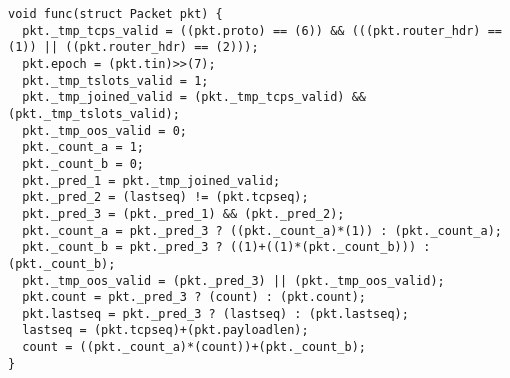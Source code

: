
\begin{lstlisting}
void func(struct Packet pkt) {
  pkt._tmp_tcps_valid = ((pkt.proto) == (6)) && (((pkt.router_hdr) == (1)) || ((pkt.router_hdr) == (2)));
  pkt.epoch = (pkt.tin)>>(7);
  pkt._tmp_tslots_valid = 1;
  pkt._tmp_joined_valid = (pkt._tmp_tcps_valid) && (pkt._tmp_tslots_valid);
  pkt._tmp_oos_valid = 0;
  pkt._count_a = 1;
  pkt._count_b = 0;
  pkt._pred_1 = pkt._tmp_joined_valid;
  pkt._pred_2 = (lastseq) != (pkt.tcpseq);
  pkt._pred_3 = (pkt._pred_1) && (pkt._pred_2);
  pkt._count_a = pkt._pred_3 ? ((pkt._count_a)*(1)) : (pkt._count_a);
  pkt._count_b = pkt._pred_3 ? ((1)+((1)*(pkt._count_b))) : (pkt._count_b);
  pkt._tmp_oos_valid = (pkt._pred_3) || (pkt._tmp_oos_valid);
  pkt.count = pkt._pred_3 ? (count) : (pkt.count);
  pkt.lastseq = pkt._pred_3 ? (lastseq) : (pkt.lastseq);
  lastseq = (pkt.tcpseq)+(pkt.payloadlen);
  count = ((pkt._count_a)*(count))+(pkt._count_b);
}
\end{lstlisting}
